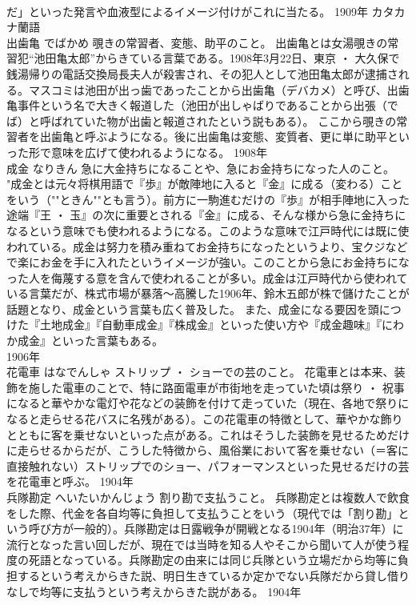 \documentclass[8pt]{extreport}
\begin{document}
\begin{CJK}{UTF8}{min}
\\	だ」といった発言や血液型によるイメージ付けがこれに当たる。	1909年	カタカナ蘭語	
\\	出歯亀	でばかめ	覗きの常習者、変態、助平のこと。	出歯亀とは女湯覗きの常習犯“池田亀太郎”からきている言葉である。1908年3月22日、東京 ・ 大久保で銭湯帰りの電話交換局長夫人が殺害され、その犯人として池田亀太郎が逮捕される。マスコミは池田が出っ歯であったことから出歯亀（デバカメ）と呼び、出歯亀事件という名で大きく報道した（池田が出しゃばりであることから出張（でば）と呼ばれていた物が出歯と報道されたという説もある）。 ここから覗きの常習者を出歯亀と呼ぶようになる。後に出歯亀は変態、変質者、更に単に助平といった形で意味を広げて使われるようになる。	1908年	
\\	成金	なりきん	急に大金持ちになることや、急にお金持ちになった人のこと。	"成金とは元々将棋用語で『歩』が敵陣地に入ると『金』に成る（変わる）ことをいう（""ときん""とも言う）。前方に一駒進むだけの『歩』が相手陣地に入った途端『王 ・ 玉』の次に重要とされる『金』に成る、そんな様から急に金持ちになるという意味でも使われるようになる。このような意味で江戸時代には既に使われている。成金は努力を積み重ねてお金持ちになったというより、宝クジなどで楽にお金を手に入れたというイメージが強い。このことから急にお金持ちになった人を侮蔑する意を含んで使われることが多い。成金は江戸時代から使われている言葉だが、株式市場が暴落～高騰した1906年、鈴木五郎が株で儲けたことが話題となり、成金という言葉も広く普及した。 また、成金になる要因を頭につけた『土地成金』『自動車成金』『株成金』といった使い方や『成金趣味』『にわか成金』といった言葉もある。
\\	1906年	
\\	花電車	はなでんしゃ	ストリップ ・ ショーでの芸のこと。	花電車とは本来、装飾を施した電車のことで、特に路面電車が市街地を走っていた頃は祭り ・ 祝事になると華やかな電灯や花などの装飾を付けて走っていた（現在、各地で祭りになると走らせる花バスに名残がある）。この花電車の特徴として、華やかな飾りとともに客を乗せないといった点がある。これはそうした装飾を見せるためだけに走らせるからだが、こうした特徴から、風俗業において客を乗せない（＝客に直接触れない）ストリップでのショー、パフォーマンスといった見せるだけの芸を花電車と呼ぶ。	1904年	
\\	兵隊勘定	へいたいかんじょう	割り勘で支払うこと。	兵隊勘定とは複数人で飲食をした際、代金を各自均等に負担して支払うことをいう（現代では「割り勘」という呼び方が一般的）。兵隊勘定は日露戦争が開戦となる1904年（明治37年）に流行となった言い回しだが、現在では当時を知る人やそこから聞いて人が使う程度の死語となっている。兵隊勘定の由来には同じ兵隊という立場だから均等に負担するという考えからきた説、明日生きているか定かでない兵隊だから貸し借りなしで均等に支払うという考えからきた説がある。	1904年	

\end{CJK}
\end{document}

